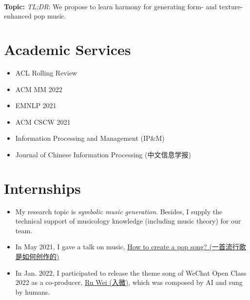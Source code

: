 \documentclass{resume}
\begin{document}
{{{\textbf{\\ \large Topic: }
{\small {}
}
\small
\textit{TL;DR}: We propose to learn harmony for generating form- and texture- enhanced pop music.

\section{Academic Services}
\begin{itemize}
  \item ACL Rolling Review
  \item ACM MM 2022
  \item EMNLP 2021
  \item ACM CSCW 2021
  \item Information Processing and Management (IP\&M)
  \item Journal of Chinese Information Processing (中文信息学报)
\end{itemize}

\section{Internships}
{\small {}
}
\begin{itemize}
  \item My research topic is \textit{symbolic music generation}. Besides, I supply the technical support of musicology knowledge (including music theory) for our team. 
  \item In May 2021, I gave a talk on music, \href{https://www.zhangxueyao.com/data/wcpr-pop-music.pdf}{\underline{How to create a pop song? (一首流行歌是如何创作的)}}
  \item In Jan. 2022, I participated to release the theme song of WeChat Open Class 2022 as a co-producer, \href{https://y.qq.com/n/ryqq/songDetail/000xeNJ53orPG2}{Ru Wei (入微)}, which was composed by AI and sung by humans.
\end{itemize}

}}}
\end{document}
